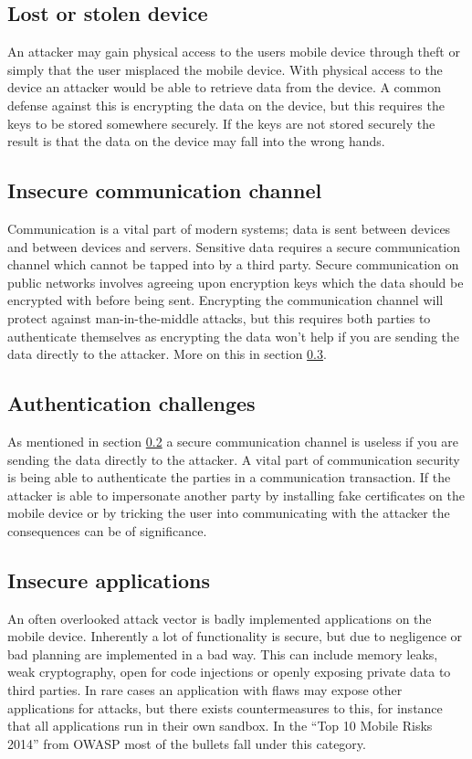 \subsection{Lost or stolen device}
An attacker may gain physical access to the users mobile device through theft or simply that the user misplaced the mobile device. With physical access to the device an attacker would be able to retrieve data from the device. A common defense against this is encrypting the data on the device, but this requires the keys to be stored somewhere securely. If the keys are not stored securely the result is that the data on the device may fall into the wrong hands.

\subsection{Insecure communication channel}
\label{sec:unsecureCommunication}
Communication is a vital part of modern systems; data is sent between devices and between devices and servers. Sensitive data requires a secure communication channel which cannot be tapped into by a third party. Secure communication on public networks involves agreeing upon encryption keys which the data should be encrypted with before being sent. Encrypting the communication channel will protect against man-in-the-middle attacks, but this requires both parties to authenticate themselves as encrypting the data won't help if you are sending the data directly to the attacker. More on this in section \ref{sec:authenticationChallenges}.

\subsection{Authentication challenges}
\label{sec:authenticationChallenges}
As mentioned in section \ref{sec:unsecureCommunication} a secure communication channel is useless if you are sending the data directly to the attacker. A vital part of communication security is being able to authenticate the parties in a communication transaction. If the attacker is able to impersonate another party by installing fake certificates on the mobile device or by tricking the user into communicating with the attacker the consequences can be of significance.

\subsection{Insecure applications}
An often overlooked attack vector is badly implemented applications on the mobile device. Inherently a lot of functionality is secure, but due to negligence or bad planning are implemented in a bad way. This can include memory leaks, weak cryptography, open for code injections or openly exposing private data to third parties. In rare cases an application with flaws may expose other applications for attacks, but there exists countermeasures to this, for instance that all applications run in their own sandbox. In the ``Top 10 Mobile Risks 2014'' from OWASP \cite{OWASPTopTenMobile} most of the bullets fall under this category.
\fi %
